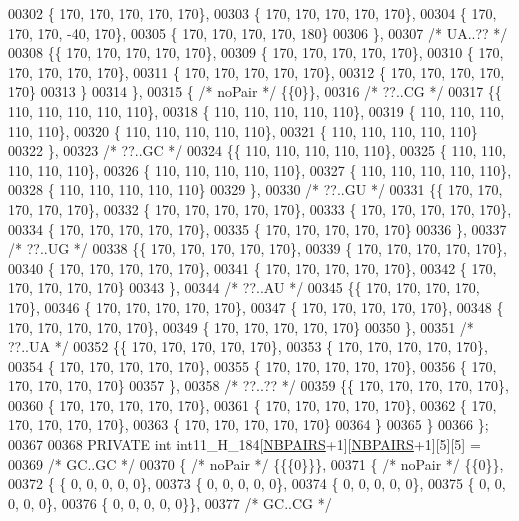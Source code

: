 \begin{DoxyCode}
00302 \{ 170, 170, 170, 170, 170\},
00303 \{ 170, 170, 170, 170, 170\},
00304 \{ 170, 170, 170, -40, 170\},
00305 \{ 170, 170, 170, 170, 180\}
00306 \},
00307 \textcolor{comment}{/* UA..?? */}
00308 \{\{ 170, 170, 170, 170, 170\},
00309 \{ 170, 170, 170, 170, 170\},
00310 \{ 170, 170, 170, 170, 170\},
00311 \{ 170, 170, 170, 170, 170\},
00312 \{ 170, 170, 170, 170, 170\}
00313 \}
00314 \},
00315 \{ \textcolor{comment}{/* noPair */} \{\{0\}\},
00316 \textcolor{comment}{/* ??..CG */}
00317 \{\{ 110, 110, 110, 110, 110\},
00318 \{ 110, 110, 110, 110, 110\},
00319 \{ 110, 110, 110, 110, 110\},
00320 \{ 110, 110, 110, 110, 110\},
00321 \{ 110, 110, 110, 110, 110\}
00322 \},
00323 \textcolor{comment}{/* ??..GC */}
00324 \{\{ 110, 110, 110, 110, 110\},
00325 \{ 110, 110, 110, 110, 110\},
00326 \{ 110, 110, 110, 110, 110\},
00327 \{ 110, 110, 110, 110, 110\},
00328 \{ 110, 110, 110, 110, 110\}
00329 \},
00330 \textcolor{comment}{/* ??..GU */}
00331 \{\{ 170, 170, 170, 170, 170\},
00332 \{ 170, 170, 170, 170, 170\},
00333 \{ 170, 170, 170, 170, 170\},
00334 \{ 170, 170, 170, 170, 170\},
00335 \{ 170, 170, 170, 170, 170\}
00336 \},
00337 \textcolor{comment}{/* ??..UG */}
00338 \{\{ 170, 170, 170, 170, 170\},
00339 \{ 170, 170, 170, 170, 170\},
00340 \{ 170, 170, 170, 170, 170\},
00341 \{ 170, 170, 170, 170, 170\},
00342 \{ 170, 170, 170, 170, 170\}
00343 \},
00344 \textcolor{comment}{/* ??..AU */}
00345 \{\{ 170, 170, 170, 170, 170\},
00346 \{ 170, 170, 170, 170, 170\},
00347 \{ 170, 170, 170, 170, 170\},
00348 \{ 170, 170, 170, 170, 170\},
00349 \{ 170, 170, 170, 170, 170\}
00350 \},
00351 \textcolor{comment}{/* ??..UA */}
00352 \{\{ 170, 170, 170, 170, 170\},
00353 \{ 170, 170, 170, 170, 170\},
00354 \{ 170, 170, 170, 170, 170\},
00355 \{ 170, 170, 170, 170, 170\},
00356 \{ 170, 170, 170, 170, 170\}
00357 \},
00358 \textcolor{comment}{/* ??..?? */}
00359 \{\{ 170, 170, 170, 170, 170\},
00360 \{ 170, 170, 170, 170, 170\},
00361 \{ 170, 170, 170, 170, 170\},
00362 \{ 170, 170, 170, 170, 170\},
00363 \{ 170, 170, 170, 170, 170\}
00364 \}
00365 \}
00366 \};
00367 
00368 PRIVATE \textcolor{keywordtype}{int} int11\_H\_184[\hyperlink{energy__const_8h_a5e75221c779d618eab81e096f37e32ce}{NBPAIRS}+1][\hyperlink{energy__const_8h_a5e75221c779d618eab81e096f37e32ce}{NBPAIRS}+1][5][5] =
00369  \textcolor{comment}{/* GC..GC */}
00370 \{ \textcolor{comment}{/* noPair */} \{\{\{0\}\}\},
00371 \{ \textcolor{comment}{/* noPair */} \{\{0\}\},
00372 \{ \{  0, 0, 0, 0, 0\},
00373 \{  0, 0, 0, 0, 0\},
00374 \{  0, 0, 0, 0, 0\},
00375 \{  0, 0, 0, 0, 0\},
00376 \{  0, 0, 0, 0, 0\}\},
00377  \textcolor{comment}{/* GC..CG */}

\end{DoxyCode}
